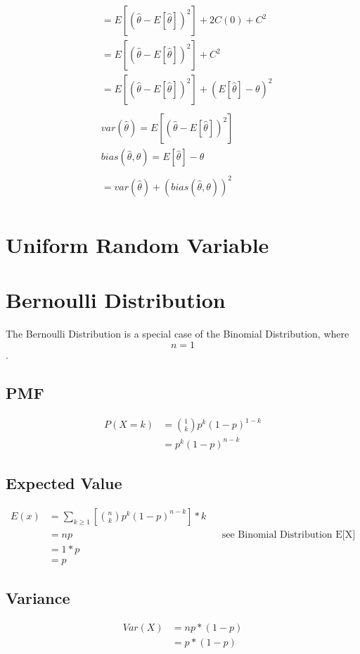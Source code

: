 \documentclass[]{book}
\begin{document}
\begin{align}
	&= E[(\hat{\theta} - E[\hat{\theta}])^2] + 2C(0) + C^2\\
	&= E[(\hat{\theta} - E[\hat{\theta}])^2] + C^2\\
	&= E[(\hat{\theta} - E[\hat{\theta}])^2] + (E[\hat{\theta}]  - \theta)^2\\	
	\\
	& var(\hat{\theta}) = E[(\hat{\theta} - E[\hat{\theta}])^2]\\
	& bias(\hat{\theta}, \theta) = E[\hat{\theta}]  - \theta\\
	\\
	&= var(\hat{\theta}) + (bias(\hat{\theta}, \theta))^2\\	
\end{align}

\section {Uniform Random Variable}

\section {Bernoulli Distribution}

The Bernoulli Distribution is a special case of the Binomial Distribution, where $$n=1$$.

\subsection{PMF}
\begin{align}
P(X=k) &= \binom{1} {k} p^k (1-p)^{1-k}\\
&=p^k (1-p)^{n-k}
\end{align}

\subsection {Expected Value}
\begin{align}
E(x) &= \sum_{k \geqslant 1} [\binom{n}{k} p^k (1-p)^{n-k}] * k\\
&= np && \text{see Binomial Distribution E[X]}\\
&= 1*p\\
&= p
\end{align}

\subsection {Variance}
\begin{align}
Var(X) &= np*(1-p)\\
&= p*(1-p)\\
\end{align}
\end{document}
